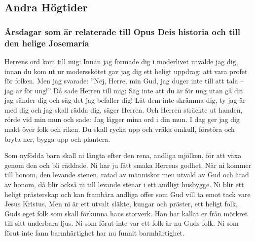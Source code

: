 \subsection{Andra Högtider}

\subsubsection{Årsdagar som är relaterade till Opus Deis historia och till den helige Josemaría}


 

Herrens ord kom till mig:
Innan jag formade dig i moderlivet
utvalde jag dig,
innan du kom ut ur modersskötet
gav jag dig ett heligt uppdrag:
att vara profet för folken.
Men jag svarade: ”Nej, Herre, min Gud, jag duger inte till att tala – jag är för ung!” Då sade Herren till mig:
Säg inte att du är för ung
utan gå dit jag sänder dig
och säg det jag befaller dig!
Låt dem inte skrämma dig,
ty jag är med dig
och jag skall rädda dig,
säger Herren.
Och Herren sträckte ut handen, rörde vid min mun och sade:
Jag lägger mina ord i din mun.
I dag ger jag dig makt
över folk och riken.
Du skall rycka upp och vräka omkull,
förstöra och bryta ner,
bygga upp och plantera.

\newpage
{}

Som nyfödda barn skall ni längta efter den rena, andliga mjölken, för att växa genom den och bli räddade.
Ni har ju fått smaka Herrens godhet.
När ni kommer till honom, den levande stenen, ratad av människor men utvald av Gud och ärad av honom,
då blir också ni till levande stenar i ett andligt husbygge. Ni blir ett heligt prästerskap och kan frambära andliga offer som Gud vill ta emot tack vare Jesus Kristus.
Men ni är ett utvalt släkte, kungar och präster, ett heligt folk, Guds eget folk som skall förkunna hans storverk. Han har kallat er från mörkret till sitt underbara ljus.
Ni som förut inte var ett folk är nu Guds folk. Ni som förut inte fann barmhärtighet har nu funnit barmhärtighet.



